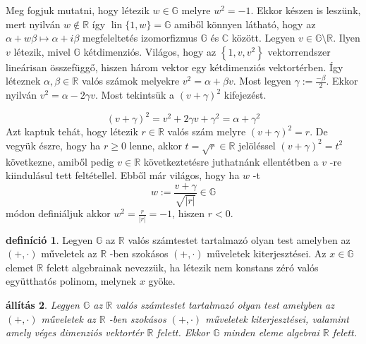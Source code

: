 \documentclass[9pt, a4paper, showtrims]{memoir}
\makeatletter
\renewenvironment{proof}[1][\proofname]
    {\par\pushQED{\qed}%
    \normalfont \topsep6\p@\@plus6\p@\relax
    \trivlist
    \item[\hskip\labelsep
        \itshape
    #1\@addpunct{:}]\ignorespaces}
    {\popQED\endtrivlist\@endpefalse}
\theoremstyle{plain}
\newtheorem{proposition}{állítás}[chapter]
\theoremstyle{remark}
\theoremstyle{definition}
\newtheorem{definition}[proposition]{definíció}
\DeclareMathOperator{\lin}{lin}
\makeatother
\begin{document}
\begin{proof}
    Meg fogjuk mutatni, hogy létezik $w\in \mathbb{G}$ melyre $w^{2}=-1$.
    Ekkor
    készen is leszünk, mert nyilván $w\notin \mathbb{R}$ így $\lin\{1,w\}=\mathbb{G}$ amiből könnyen látható, hogy
    az $\alpha +w\beta \longmapsto \alpha +i\beta $ megfeleltetés
    izomorfizmus $\mathbb{G}$ és $\mathbb{C}$ között.
    \newline
    Legyen $v\in \mathbb{G}\setminus \mathbb{R}$.
    Ilyen $v$ létezik, mivel $\mathbb{G}
    $ kétdimenziós.
    Világos, hogy az $\left\{
        1,v,v^{2}\right\} $ vektorrendszer lineárisan összefüggő,
        hiszen három vektor egy kétdimenziós vektortérben.
        \'{I}gy léteznek $\alpha ,\beta \in \mathbb{R}$ valós számok melyekre $v^{2}=\alpha +\beta v$.
        Most legyen $\gamma :=\frac{-\beta }{2}
        $.
        Ekkor nyilván $v^{2}=\alpha -2\gamma v$.
        Most tekintsük a $\left(
        v+\gamma \right) ^{2}$ kifejezést.

        \[
            \left( v+\gamma \right) ^{2}=v^{2}+2\gamma v+\gamma ^{2}=\alpha +\gamma ^{2}
        \]
        Azt kaptuk tehát, hogy létezik $r\in \mathbb{R}$ valós szám
        melyre $\left( v+\gamma \right) ^{2}=r$.
        De vegyük észre, hogy ha $r\geq 0$ lenne, 
        akkor $t=\sqrt{r}\in\mathbb{R}$
        jelöléssel $\left( v+\gamma \right)^2=t^2$ következne, amiből pedig $v\in \mathbb{R}$ következtetésre juthatnánk ellentétben a $v$ -re kiindulásul tett feltétellel.
        Ebből már
        világos, hogy ha $w$ -t 
        \[
            w:=\frac{v+\gamma }{\sqrt{\left| r\right| }}\in \mathbb{G}
        \]
        módon definiáljuk akkor $w^{2}=\frac{r}{\left| r\right| }=-1$,
        hiszen $r<0$.
\end{proof}

\begin{definition}
    Legyen $\mathbb{G}$ az $\mathbb{R}$ valós számtestet tartalmazó olyan
    test amelyben az $\left( +,\cdot \right) $ műveletek az $\mathbb{R}$ -ben
    szokásos $\left( +,\cdot \right) $ műveletek kiterjesztései.
    Az $x\in \mathbb{G}$ elemet $\mathbb{R}$ felett algebrainak nevezzük, ha létezik nem konstans zéró valós együtthatós polinom,
    melynek $x$ gyöke.
\end{definition}

\begin{proposition}
    Legyen $\mathbb{G}$ az $\mathbb{R}$ valós számtestet tartalmazó olyan
    test amelyben az $\left( +,\cdot \right) $ műveletek az $\mathbb{R}$ -ben
    szokásos $\left( +,\cdot \right) $ műveletek kiterjesztései,
    valamint amely véges dimenziós vektortér $\mathbb{R}$ felett.
    Ekkor $\mathbb{G}$ minden eleme algebrai $\mathbb{R}$ felett.
\end{proposition}
\end{document}
